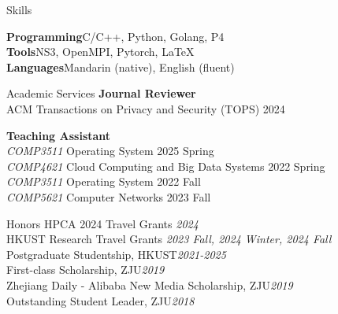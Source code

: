 \documentclass{resume} %
\begin{document}
\begin{rSection}{Skills}

{\bf Programming}{\quad C/C++, Python, Golang, P4}
\\{\bf Tools}{\quad NS3, OpenMPI, Pytorch, \LaTeX}
\\{\bf Languages}{\quad Mandarin (native), English (fluent)}
\end{rSection}
\begin{rSection}{Academic Services}
\textbf{Journal Reviewer}\\
ACM Transactions on Privacy and Security (TOPS) \hfill {2024}

\textbf{Teaching Assistant}\\
{\small \textit{COMP3511} Operating System \hfill {2025 Spring}}\\
{\small \textit{COMP4621} Cloud Computing and Big Data Systems \hfill {2022 Spring}}\\
{\small \textit{COMP3511} Operating System \hfill {2022 Fall}}\\
{\small \textit{COMP5621} Computer Networks \hfill {2023 Fall}}






\end{rSection}


\begin{rSection}{Honors}
HPCA 2024 Travel Grants \hfill{\em 2024}\\
HKUST Research Travel Grants \hfill{\em2023 Fall, 2024 Winter, 2024 Fall}\\
Postgraduate Studentship, HKUST\hfill{\em 2021-2025}\\
First-class Scholarship, ZJU\hfill{\em 2019}\\
Zhejiang Daily - Alibaba New Media Scholarship, ZJU\hfill{\em 2019}\\
Outstanding Student Leader, ZJU\hfill{\em 2018}

\end{rSection}
\end{document}

